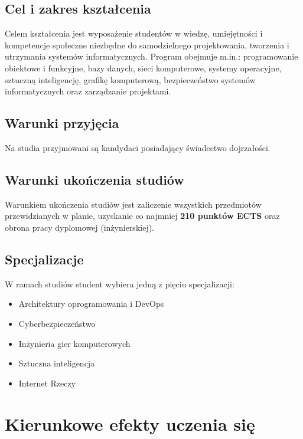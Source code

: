 \documentclass[12pt,a4paper]{article}
\begin{document}
\subsection{Cel i zakres kształcenia}

Celem kształcenia jest wyposażenie studentów w wiedzę, umiejętności i kompetencje społeczne niezbędne do samodzielnego projektowania, tworzenia i utrzymania systemów informatycznych. Program obejmuje m.in.: programowanie obiektowe i funkcyjne, bazy danych, sieci komputerowe, systemy operacyjne, sztuczną inteligencję, grafikę komputerową, bezpieczeństwo systemów informatycznych oraz zarządzanie projektami.

\subsection{Warunki przyjęcia}

Na studia przyjmowani są kandydaci posiadający świadectwo dojrzałości.

\subsection{Warunki ukończenia studiów}

Warunkiem ukończenia studiów jest zaliczenie wszystkich przedmiotów przewidzianych w planie, uzyskanie co najmniej \textbf{210 punktów ECTS} oraz obrona pracy dyplomowej (inżynierskiej).

\subsection{Specjalizacje}

W ramach studiów student wybiera jedną z pięciu specjalizacji:
\begin{itemize}
  \item Architektury oprogramowania i DevOps
  \item Cyberbezpieczeństwo
  \item Inżynieria gier komputerowych
  \item Sztuczna inteligencja
  \item Internet Rzeczy
\end{itemize}

\newpage

\section{Kierunkowe efekty uczenia się}
\end{document}
